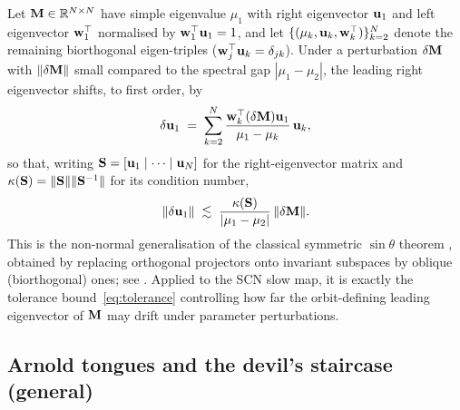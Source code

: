 \begin{theorem}\label{thm:supp:davis-kahan}
Let $\mathbf{M}\in\mathbb{R}^{N\times N}$ have simple eigenvalue $\mu_1$ with right eigenvector $\mathbf{u}_1$ and left eigenvector $\mathbf{w}_1^\top$ normalised by $\mathbf{w}_1^\top\mathbf{u}_1=1$, and let $\{(\mu_k,\mathbf{u}_k,\mathbf{w}_k^\top)\}_{k=2}^{N}$ denote the remaining biorthogonal eigen-triples ($\mathbf{w}_j^\top\mathbf{u}_k=\delta_{jk}$). Under a perturbation $\delta\mathbf{M}$ with $\|\delta\mathbf{M}\|$ small compared to the spectral gap $|\mu_1-\mu_2|$, the leading right eigenvector shifts, to first order, by
\begin{equation}
\delta\mathbf{u}_1 \;=\; \sum_{k=2}^{N}\frac{\mathbf{w}_k^\top(\delta\mathbf{M})\mathbf{u}_1}{\mu_1-\mu_k}\,\mathbf{u}_k,
\end{equation}
so that, writing $\mathbf{S}=[\mathbf{u}_1\mid\cdots\mid\mathbf{u}_N]$ for the right-eigenvector matrix and $\kappa(\mathbf{S})=\|\mathbf{S}\|\|\mathbf{S}^{-1}\|$ for its condition number,
\begin{equation}
\|\delta\mathbf{u}_1\| \;\lesssim\; \frac{\kappa(\mathbf{S})}{|\mu_1-\mu_2|}\,\|\delta\mathbf{M}\|.
\end{equation}
This is the non-normal generalisation of the classical symmetric $\sin\theta$ theorem \citep{davis1970rotation}, obtained by replacing orthogonal projectors onto invariant subspaces by oblique (biorthogonal) ones; see \citep[Chapter V]{stewart1990matrix}. Applied to the SCN slow map, it is exactly the tolerance bound~\eqref{eq:tolerance} controlling how far the orbit-defining leading eigenvector of $\mathbf{M}$ may drift under parameter perturbations.
\end{theorem}

\subsection{Arnold tongues and the devil's staircase (general)}\label{sec:supp:arnold}

